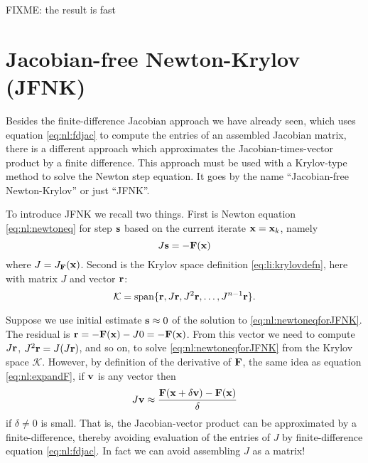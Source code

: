 FIXME: the result is fast


\section{Jacobian-free Newton-Krylov (JFNK)} \label{sec:JFNK}

Besides the finite-difference Jacobian approach we have already seen, which uses equation \eqref{eq:nl:fdjac} to compute the entries of an assembled Jacobian matrix, there is a different approach which approximates the Jacobian-times-vector product by a finite difference.  This approach must be used with a Krylov-type method to solve the Newton step equation.  It goes by the name ``Jacobian-free Newton-Krylov'' \citep{KnollKeyes2004} or just ``JFNK''.

To introduce JFNK we recall two things.  First is Newton equation \eqref{eq:nl:newtoneq} for step $\mathbf{s}$ based on the current iterate $\mathbf{x}=\mathbf{x}_k$, namely
\begin{equation}
    J \mathbf{s} = - \mathbf{F}(\mathbf{x}) \label{eq:nl:newtoneqforJFNK}
\end{equation}
where $J = J_{\mathbf{F}}(\mathbf{x})$.  Second is the Krylov space definition \eqref{eq:li:krylovdefn}, here with matrix $J$ and vector $\mathbf{r}$:
\begin{equation}
    \mathcal{K} = \operatorname{span}\{\mathbf{r},J\mathbf{r},J^2\mathbf{r},\dots,J^{n-1}\mathbf{r}\}.  \label{eq:nl:krylovagain}
\end{equation}

Suppose we use initial estimate $\bs{}$ \citep{KnollKeyes2004} of the solution to \eqref{eq:nl:newtoneqforJFNK}.  The residual is $\br = - \bF(\bx) - J 0 = - \bF(\bx)$.  From this vector we need to compute $J\br$, $J^2\br=J(J\br)$, and so on, to solve \eqref{eq:nl:newtoneqforJFNK} from the Krylov space $$.  However, by definition of the derivative of $\bF$, the same idea as equation \eqref{eq:nl:expandF}, if $\bv$ is any vector then
\begin{equation}
J \bv \approx \frac{\bF(\bx+\delta \bv) - \bF(\bx)}{\delta} \label{eq:nl:JFNKbasic}
\end{equation}
if $\delta {}$ is small.  That is, the Jacobian-vector product can be approximated by a finite-difference, thereby avoiding evaluation of the entries of $J$ by finite-difference equation \eqref{eq:nl:fdjac}. In fact we can avoid assembling $J$ as a matrix!

